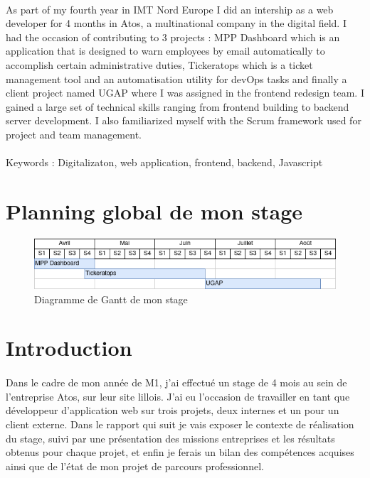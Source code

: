 \documentclass[12pt]{article}
\begin{document}
\begin {sloppypar}
\paragraph{}
As part of my fourth year in IMT Nord Europe I did an intership as a web developer for 4 months 
in Atos, a multinational company in the digital field. I had the occasion of contributing to 3 projects : 
MPP Dashboard which is an application that is designed to warn employees by email automatically to accomplish certain 
administrative duties, Tickeratops which is a ticket management tool and an automatisation utility for devOps tasks and 
finally a client project named UGAP where I was assigned in the frontend redesign team. I gained a large set of technical 
skills ranging from frontend building to backend server development. I also familiarized myself 
with the Scrum framework used for project and team management.
\paragraph{}
Keywords : Digitalizaton, web application, frontend, backend, Javascript
\newpage

\section*{Planning global de mon stage}
\begin{figure}[h]
  \includegraphics[width=\textwidth] {gantt.png}
  \caption {Diagramme de Gantt de mon stage}
\end{figure}
\newpage

\section{Introduction}
\paragraph{}
Dans le cadre de mon année de M1, j'ai effectué un stage de 4 mois au sein de l'entreprise 
Atos, sur leur site lillois. J'ai eu l'occasion de travailler en tant que développeur d'application 
web sur trois projets, deux internes et un pour un client externe. Dans le rapport qui suit je vais exposer le contexte 
de réalisation du stage, suivi par une présentation des missions entreprises et les résultats obtenus pour chaque projet,
et enfin je ferais un bilan des compétences acquises ainsi que de l'état de mon projet de parcours professionnel. 


\end{sloppypar}
\end{document}
